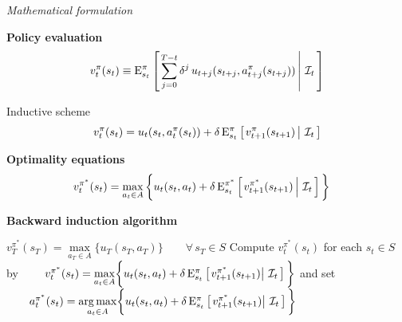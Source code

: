 \begin{frame}\begin{center}
		\LARGE\textit{Mathematical formulation}
\end{center}\end{frame}
\begin{frame}
\textbf{Policy evaluation}\vspace{0.3cm}
\begin{align*}
  v^\pi_t(s_t) \equiv \mathrm{E}_{s_t}^\pi\left[\left.\sum^{T - t}_{j = 0}  \delta^j\, u_{t + j}(s_{t + j}, a^\pi_{t + j}(s_{t + j})) \,\right\vert\,\mathcal{I}_t\,\right]\\
\end{align*}

Inductive scheme
\begin{align*}
v^\pi_t(s_t) = u_t(s_t,  a^\pi_t(s_t)) + \delta\,\mathrm{E}^\pi_{s_t} \left[\left.v^\pi_{t + 1}(s_{t + 1})  \,\right\vert\,\mathcal{I}_t\,\right]
\end{align*}
\end{frame}
\begin{frame}
\textbf{Optimality equations}\vspace{0.3cm}
\begin{align*}
v^{\pi^*}_t(s_t)  & = \max_{a_t \in A}\bigg\{ u_t(s_t, a_t) + \delta\, \mathrm{E}^{\pi^*}_{s_t} \left[\left.v^{\pi^*}_{t + 1}(s_{t + 1})\,\right\vert\,\mathcal{I}_t\,\right] \bigg\}
\end{align*}
\end{frame}
\begin{frame}\textbf{Backward induction algorithm}\vspace{0.5cm}

\begin{algorithmic}\small
{}
        \State $v^{\pi^*}_T(s_T) =  \underset{a_T\in A}{\max} \bigg\{ u_T(s_T, a_T) \bigg\}\qquad \forall\, s_T\in S$
    \Else
        \State Compute $v^{\pi^*}_t(s_t)$ for each $s_t\in S$ by
        \State $\qquad v^{\pi^*}_t(s_t) = \underset{a_t\in A}{\max} \bigg\{ u_t(s_t, a_t) + \delta\,\mathrm{E}^\pi_{s_t} \left[\left.v^{\pi^*}_{t + 1}(s_{t + 1})\right\vert\,\mathcal{I}_t\,\right] \bigg\}$
        \State and set
        \State $\qquad a^{\pi^*}_t(s_t) = \underset{a_t\in A}{\operatorname*{arg\,max}} \bigg\{ u_t(s_t, a_t) + \delta\,\mathrm{E}^\pi_{s_t} \left[\left.v^{\pi^*}_{t + 1}(s_{t + 1})\right\vert\,\mathcal{I}_t\,\right] \bigg\}$
    \EndIf
\EndFor
\vspace{0.3cm}\end{algorithmic}
\end{frame}
